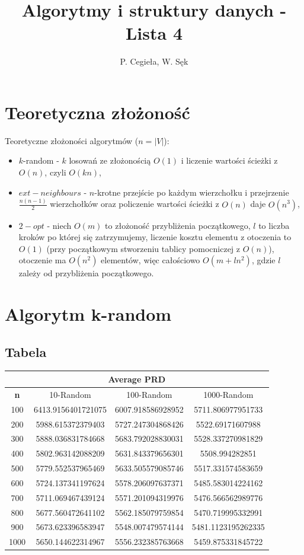 \documentclass{article}
\title{Algorytmy i struktury danych - Lista 4}
\author{P. Cegieła, W. Sęk}
\begin{document}
 

\maketitle

\section{Teoretyczna złożoność}
Teoretyczne złożoności algorytmów ($n=|V|$):
\begin{itemize}
\item $k$-random - $k$ losowań ze złożonością $O(1)$ i liczenie wartości ścieżki z $O(n)$, czyli $O(kn)$,
\item $ext-neighbours$ - $n$-krotne przejście po każdym wierzchołku i przejrzenie $\frac{n(n-1)}{2}$ wierzchołków oraz policzenie wartości ścieżki z $O(n)$ daje $O(n^3)$,
\item $2-opt$ - niech $O(m)$ to złożoność przybliżenia początkowego, $l$ to liczba kroków po której się zatrzymujemy, liczenie kosztu elementu z otoczenia to $O(1)$ (przy początkowym stworzeniu tablicy pomocniczej z $O(n)$), otoczenie ma $O(n^2)$ elementów, więc całościowo $O(m+ln^2)$, gdzie $l$ zależy od przybliżenia początkowego.
\end{itemize}
\newpage
\section{Algorytm k-random}
\subsection{Tabela}
\begin{center}
\begin{tabular}{|c|c|c|c|}
\hline
\multicolumn{4}{|c|}{\textbf{Average PRD}}\\
\hline
\textbf{n} & 10-Random & 100-Random & 1000-Random\\
\hline
100 & 6413.9156401721075 & 6007.918586928952 & 5711.806977951733\\
\hline
200 & 5988.615372379403 & 5727.247304868426 & 5522.69171607988\\
\hline
300 & 5888.036831784668 & 5683.792028830031 & 5528.337270981829\\
\hline
400 & 5802.963142088209 & 5631.843379656301 & 5508.994282851\\
\hline
500 & 5779.552537965469 & 5633.505579085746 & 5517.331574583659\\
\hline
600 & 5724.137341197624 & 5578.206097637371 & 5485.583014224162\\
\hline
700 & 5711.069467439124 & 5571.201094319976 & 5476.566562989776\\
\hline
800 & 5677.560472641102 & 5562.185079759854 & 5470.719995332991\\
\hline
900 & 5673.623396583947 & 5548.007479574144 & 5481.1123195262335\\
\hline
1000 & 5650.144622314967 & 5556.232385763668 & 5459.875331845722\\
\hline
\end{tabular}
\end{center}
\end{document}
